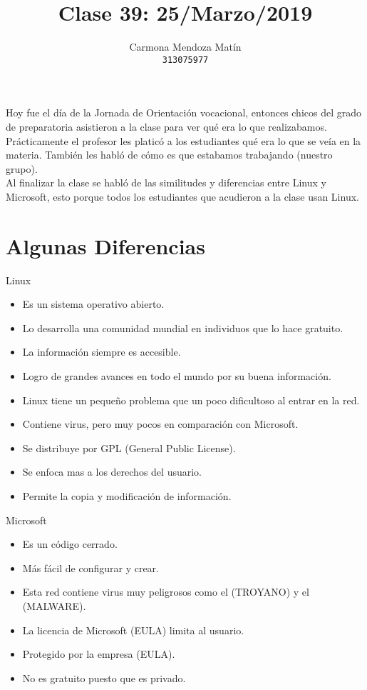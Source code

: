 \documentclass[11pt, a4paper]{report}
\begin{document}
\title{Clase 39: 25/Marzo/2019}
\author{
  Carmona Mendoza Mat\'in\\
  \texttt{313075977}
}
\date{}
\maketitle

Hoy fue el día de la Jornada de Orientación vocacional, entonces chicos del
grado de preparatoria asistieron a la clase para ver qué era lo que
realizabamos. \\

Prácticamente el profesor les platicó a los estudiantes qué era lo que se veía
en la materia. También les habló de cómo es que estabamos trabajando (nuestro
grupo). \\

Al finalizar la clase se habló de las similitudes y diferencias entre Linux y
Microsoft, esto porque todos los estudiantes que acudieron a la clase usan
Linux. \\

\section*{Algunas Diferencias}

Linux \\

\begin{itemize}
\item Es un sistema operativo abierto.
\item Lo desarrolla una comunidad mundial en individuos que lo hace gratuito.
\item La información siempre es accesible.
\item Logro de grandes avances en todo el mundo por su buena información.
\item Linux tiene un pequeño problema que un poco dificultoso al entrar en la
  red.
\item Contiene virus, pero muy pocos en comparación con Microsoft.
\item Se distribuye por GPL (General Public License).
\item Se enfoca mas a los derechos del usuario.
\item Permite la copia y modificación de información.
\end{itemize}

Microsoft \\

\begin{itemize}
\item Es un código cerrado.
\item Más fácil de configurar y crear.
\item Esta red contiene virus muy peligrosos como el (TROYANO) y el (MALWARE).
\item La licencia de Microsoft (EULA) limita al usuario.
\item Protegido por la empresa (EULA).
\item No es gratuito puesto que es privado.
\end{itemize}
\end{document}
